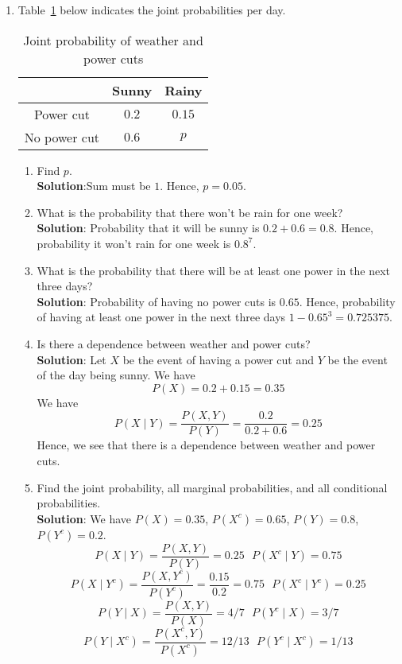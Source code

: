 \documentclass{article}
\newcommand{\bkt}[1]{\left(#1\right)}
\newcommand{\soln}[1]{\textbf{Solution}:#1}
\begin{document}
\begin{enumerate}
\begin{enumerate}
			\soln{
			The standard deviation for a year is $\sqrt{6} \approx 2.45$. Hence, the desired probability is
			$$1-e^{-6}\bkt{\dfrac{6^4}{4!}+\dfrac{6^5}{5!}+\dfrac{6^6}{6!}+\dfrac{6^7}{7!}+\dfrac{6^8}{8!}} \approx 0.3039$$
			}
		\end{enumerate}
		\item
		Table~\ref{table_1} below indicates the joint probabilities per day.
		\begin{table}[!htbp]
			\begin{center}
			\caption{Joint probability of weather and power cuts}
		\begin{tabular}{|c|c|c|}
			\hline
			& Sunny & Rainy\\
			\hline
			Power cut & $0.2$ & $0.15$ \\
			\hline
			No power cut & $0.6$ & $p$\\
			\hline
		\end{tabular}
		\label{table_1}
		\end{center}
		\end{table}
		\begin{enumerate}
			\item
			Find $p$.\\
			\soln{Sum must be $1$. Hence, $p=0.05$.}
			\item
			What is the probability that there won't be rain for one week?\\
			\soln{
			Probability that it will be sunny is $0.2+0.6=0.8$. Hence, probability it won't rain for one week is $0.8^7$.
			}
			\item
			What is the probability that there will be at least one power in the next three days?\\
			\soln{
			Probability of having no power cuts is $0.65$. Hence, probability of having at least one power in the next three days $1-0.65^3 = 0.725375$.
			}
			\item
			Is there a dependence between weather and power cuts?\\
			\soln{
			Let $X$ be the event of having a power cut and $Y$ be the event of the day being sunny.
			We have
			$$P(X) = 0.2+0.15 = 0.35$$
			We have
			$$P(X \mid Y) = \dfrac{P(X,Y)}{P(Y)} = \dfrac{0.2}{0.2+0.6} = 0.25$$
			Hence, we see that there is a dependence between weather and power cuts.
			}
			\item
			Find the joint probability, all marginal probabilities, and all conditional probabilities.\\
			\soln{
			We have $P(X) = 0.35$, $P(X^c) = 0.65$, $P(Y) = 0.8$, $P(Y^c) = 0.2$.
			$$P(X \mid Y) = \dfrac{P(X,Y)}{P(Y)} = 0.25 \,\,\,\, P(X^c \mid Y) = 0.75$$
			$$P(X \mid Y^c) = \dfrac{P(X,Y^c)}{P(Y^c)} = \dfrac{0.15}{0.2} = 0.75 \,\,\,\, P(X^c \mid Y^c) = 0.25$$
			$$P(Y \mid X) = \dfrac{P(X,Y)}{P(X)} = 4/7 \,\,\,\, P(Y^c \mid X) = 3/7$$
			$$P(Y \mid X^c) = \dfrac{P(X^c,Y)}{P(X^c)} = 12/13 \,\,\,\, P(Y^c \mid X^c) = 1/13$$
			}
		\end{enumerate}
	\end{enumerate}
	
\end{document}
